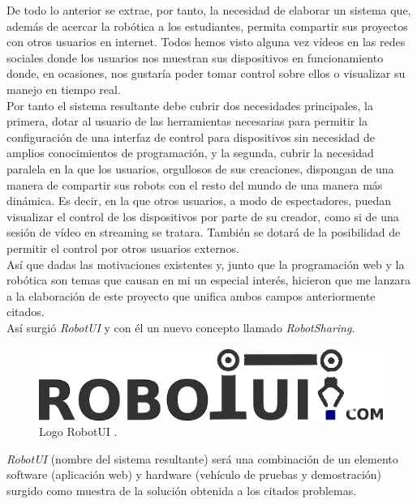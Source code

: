 \documentclass[a4paper,12pt]{article}
\begin{document}
De todo lo anterior se extrae, por tanto, la necesidad de elaborar un sistema que, además de acercar la robótica a los estudiantes, permita compartir sus proyectos con otros usuarios en internet. Todos hemos
visto alguna vez vídeos en las redes sociales donde los usuarios nos muestran sus dispositivos en funcionamiento donde, en ocasiones, nos gustaría poder tomar control sobre ellos o visualizar su manejo en tiempo real.\\

Por tanto el sistema resultante debe cubrir dos necesidades principales, la primera, dotar al usuario de las herramientas necesarias para permitir la configuración de una interfaz de control para 
dispositivos sin necesidad de amplios conocimientos de programación, y la segunda, cubrir la necesidad paralela en la que los usuarios, orgullosos de sus creaciones, dispongan de una manera de 
compartir sus robots con el resto del mundo de una manera más dinámica. Es decir, en la que otros usuarios, a modo de espectadores, puedan visualizar el control de los dispositivos por parte de 
su creador, como si de una sesión de vídeo en streaming se tratara. También se dotará de la posibilidad de permitir el control por otros usuarios externos.\\

Así que dadas las motivaciones existentes y, junto que la programación web y la robótica son temas que causan en mi un especial interés, hicieron que me lanzara a la elaboración de este
proyecto que unifica ambos campos anteriormente citados.\\

Así surgió \emph{RobotUI} y con él un nuevo concepto llamado \textit{RobotSharing}.\\

\begin{figure}[H]
  \begin{center}
    \includegraphics[scale=0.5]{imagenes/logotipo.png}
  \end{center}
 \caption{Logo RobotUI \protect\footnotemark.}
\end{figure}


\emph{RobotUI} (nombre del sistema resultante) será una combinación de un elemento software (aplicación web) y hardware (vehículo de pruebas y demostración) surgido como muestra de la solución obtenida a los citados problemas.\\
\end{document}
